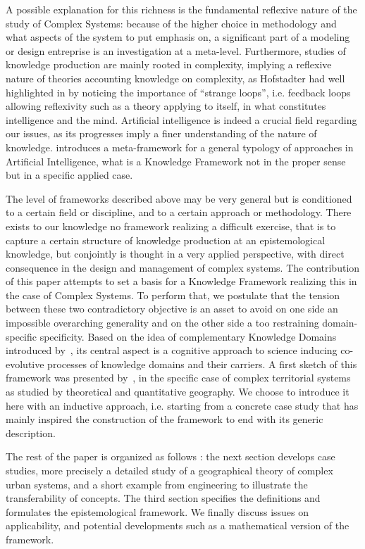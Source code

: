 \documentclass[runningheads,a4paper]{llncs2e/llncs}
\begin{document}
A possible explanation for this richness is the fundamental reflexive nature of the study of Complex Systems: because of the higher choice in methodology and what aspects of the system to put emphasis on, a significant part of a modeling or design entreprise is an investigation at a meta-level.  Furthermore, studies of knowledge production are mainly rooted in complexity, implying a reflexive nature of theories accounting knowledge on complexity, as Hofstadter had well highlighted in \cite{hofstadter1980godel} by noticing the importance of ``strange loops'', i.e. feedback loops allowing reflexivity such as a theory applying to itself, in what constitutes intelligence and the mind. Artificial intelligence is indeed a crucial field regarding our issues, as its progresses imply a finer understanding of the nature of knowledge. \cite{2017arXiv170401407M} introduces a meta-framework for a general typology of approaches in Artificial Intelligence, what is a Knowledge Framework not in the proper sense but in a specific applied case.



The level of frameworks described above may be very general but is conditioned to a certain field or discipline, and to a certain approach or methodology. There exists to our knowledge no framework realizing a difficult exercise, that is to capture a certain structure of knowledge production at an epistemological knowledge, but conjointly is thought in a very applied perspective, with direct consequence in the design and management of complex systems. The contribution of this paper attempts to set a basis for a Knowledge Framework realizing this in the case of Complex Systems. To perform that, we postulate that the tension between these two contradictory objective is an asset to avoid on one side an impossible overarching generality and on the other side a too restraining domain-specific specificity. Based on the idea of complementary Knowledge Domains introduced by~\cite{livet2010}, its central aspect is a cognitive approach to science inducing co-evolutive processes of knowledge domains and their carriers. A first sketch of this framework was presented by~\cite{raimbault:halshs-01505084}, in the specific case of complex territorial systems as studied by theoretical and quantitative geography. We choose to introduce it here with an inductive approach, i.e. starting from a concrete case study that has mainly inspired the construction of the framework to end with its generic description.


The rest of the paper is organized as follows : the next section develops case studies, more precisely a detailed study of a geographical theory of complex urban systems, and a short example from engineering to illustrate the transferability of concepts. The third section specifies the definitions and formulates the epistemological framework. We finally discuss issues on applicability, and potential developments such as a mathematical version of the framework.
\end{document}
